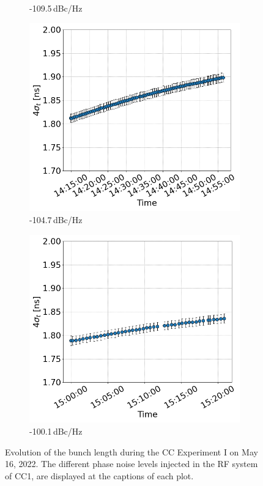 \begin{figure}[htp]
\begin{subfigure}{.45\textwidth}
         \caption{-109.5\,dBc/Hz}
     \end{subfigure}
     \begin{subfigure}{.45\textwidth}
         \centering
         \includegraphics[width=.95\linewidth]{images/app_c/bunch_length_COAST_04.png}  
         \caption{-104.7\,dBc/Hz}
     \end{subfigure}
     \begin{subfigure}{.45\textwidth}
             \centering
             \includegraphics[width=.95\linewidth]{images/app_c/bunch_length_COAST_05.png}  
             \caption{-100.1\,dBc/Hz}
     \end{subfigure}
     \caption{Evolution of the bunch length during the CC Experiment I on May 16, 2022. The different phase noise levels injected in the RF system of CC1, are displayed at the captions of each plot.}
     \label{fig:cc_md_2022_overview_plots_noise_scan_bunch_length}
  \end{figure}
  


